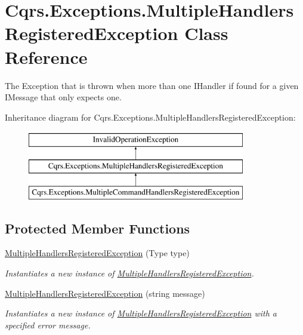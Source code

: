 \hypertarget{classCqrs_1_1Exceptions_1_1MultipleHandlersRegisteredException}{}\section{Cqrs.\+Exceptions.\+Multiple\+Handlers\+Registered\+Exception Class Reference}
\label{classCqrs_1_1Exceptions_1_1MultipleHandlersRegisteredException}


The Exception that is thrown when more than one I\+Handler if found for a given I\+Message that only expects one.  


Inheritance diagram for Cqrs.\+Exceptions.\+Multiple\+Handlers\+Registered\+Exception\+:\begin{figure}[H]
\begin{center}
\leavevmode
\includegraphics[height=3.000000cm]{classCqrs_1_1Exceptions_1_1MultipleHandlersRegisteredException}
\end{center}
\end{figure}
\subsection*{Protected Member Functions}
\begin{DoxyCompactItemize}
\item 
\hyperlink{classCqrs_1_1Exceptions_1_1MultipleHandlersRegisteredException_a5cfe27c70026da5cc37f5ad2de2bce9c_a5cfe27c70026da5cc37f5ad2de2bce9c}{Multiple\+Handlers\+Registered\+Exception} (Type type)
\begin{DoxyCompactList}\small\item\em Instantiates a new instance of \hyperlink{classCqrs_1_1Exceptions_1_1MultipleHandlersRegisteredException}{Multiple\+Handlers\+Registered\+Exception}. \end{DoxyCompactList}\item 
\hyperlink{classCqrs_1_1Exceptions_1_1MultipleHandlersRegisteredException_ade772c573d129335b96ef168aec74183_ade772c573d129335b96ef168aec74183}{Multiple\+Handlers\+Registered\+Exception} (string message)
\begin{DoxyCompactList}\small\item\em Instantiates a new instance of \hyperlink{classCqrs_1_1Exceptions_1_1MultipleHandlersRegisteredException}{Multiple\+Handlers\+Registered\+Exception} with a specified error message. \end{DoxyCompactList}\end{DoxyCompactItemize}


